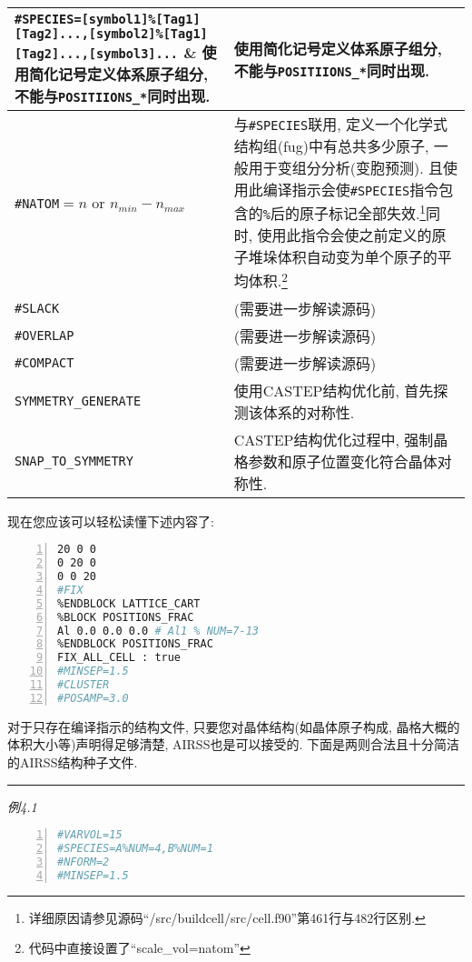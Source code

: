 \documentclass[a4paper, 10pt]{article}
\begin{document}
\begin{table}
\begin{tabular}{p{13em}|p{25em}}
          \midrule
          \verb|#SPECIES=[symbol1]%[Tag1]| \verb|[Tag2]...,[symbol2]%[Tag1]| \verb|[Tag2]...,[symbol3]...| & 使用简化记号定义体系原子组分, 不能与\verb|POSITIIONS_*|同时出现.\\
          \midrule
          \verb|#NATOM|\(=n\) or \(n_{min}-n_{max}\) & 与\verb|#SPECIES|联用, 定义一个化学式结构组(fug)中有总共多少原子, 一般用于变组分分析(变胞预测). 且使用此编译指示会使\verb|#SPECIES|指令包含的\verb|%|后的原子标记全部失效.\footnote{详细原因请参见源码``/src/buildcell/src/cell.f90''第461行与482行区别.}同时, 使用此指令会使之前定义的原子堆垛体积自动变为单个原子的平均体积.\footnote{代码中直接设置了``scale\_vol=natom''}\\
          \midrule
          \verb|#SLACK| & (需要进一步解读源码)\\
          \midrule
          \verb|#OVERLAP| & (需要进一步解读源码)\\
          \midrule
          \verb|#COMPACT| & (需要进一步解读源码)\\
          \midrule
          \verb!SYMMETRY_GENERATE! & 使用CASTEP结构优化前, 首先探测该体系的对称性.\\
          \midrule
          \verb!SNAP_TO_SYMMETRY! & CASTEP结构优化过程中, 强制晶格参数和原子位置变化符合晶体对称性.\\
          \midrule
          \bottomrule
        \end{tabular} 
      \end{table}

      现在您应该可以轻松读懂下述内容了:

      \begin{lstlisting}[language={bash},numbers=left]
%BLOCK LATTICE_CART
20 0 0
0 20 0
0 0 20
#FIX
%ENDBLOCK LATTICE_CART
%BLOCK POSITIONS_FRAC
Al 0.0 0.0 0.0 # Al1 % NUM=7-13
%ENDBLOCK POSITIONS_FRAC
FIX_ALL_CELL : true
#MINSEP=1.5
#CLUSTER
#POSAMP=3.0
      \end{lstlisting}

      对于只存在编译指示的结构文件, 只要您对晶体结构(如晶体原子构成, 晶格大概的体积大小等)声明得足够清楚, AIRSS也是可以接受的.  下面是两则合法且十分简洁的AIRSS结构种子文件.

      \noindent\rule{\textwidth}{0.3mm}

        \emph{例4.1}
      \begin{lstlisting}[language={bash},numbers=left]
#VARVOL=15
#SPECIES=A%NUM=4,B%NUM=1
#NFORM=2 
#MINSEP=1.5
       \end{lstlisting}
\end{document}
